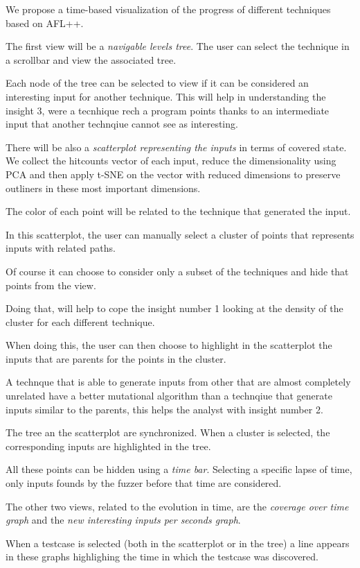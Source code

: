 \documentclass[conference,compsoc]{IEEEtran}
\begin{document}
We propose a time-based visualization of the progress of different techniques based on {\sc AFL++}.

The first view will be a {\em navigable levels tree}. The user can select the technique in a scrollbar and view the associated tree.

Each node of the tree can be selected to view if it can be considered an interesting input for another technique. This will help in understanding the insight 3, were a tecnhique rech a program points thanks to an intermediate input that another technqiue cannot see as interesting.

There will be also a {\em scatterplot representing the inputs} in terms of covered state.
We collect the hitcounts vector of each input, reduce the dimensionality using PCA and then apply t-SNE on the vector with reduced dimensions to preserve outliners in these most important dimensions.

The color of each point will be related to the technique that generated the input.

In this scatterplot, the user can manually select a cluster of points that represents inputs with related paths.

Of course it can choose to consider only a subset of the techniques and hide that points from the view.

Doing that, will help to cope the insight number 1 looking at the density of the cluster for each different technique.

When doing this, the user can then choose to highlight in the scatterplot the inputs that are parents for the points in the cluster.

A technque that is able to generate inputs from other that are almost completely unrelated have a better mutational algorithm than a technqiue that generate inputs similar to the parents, this helps the analyst with insight number 2.

The tree an the scatterplot are synchronized. When a cluster is selected, the corresponding inputs are highlighted in the tree.

All these points can be hidden using a {\em time bar}. Selecting a specific lapse of time, only inputs founds by the fuzzer before that time are considered.

The other two views, related to the evolution in time, are the {\em coverage over time graph} and the {\em new interesting inputs per seconds graph}.

When a testcase is selected (both in the scatterplot or in the tree) a line appears in these graphs highlighing the time in which the testcase was discovered.
\end{document}
